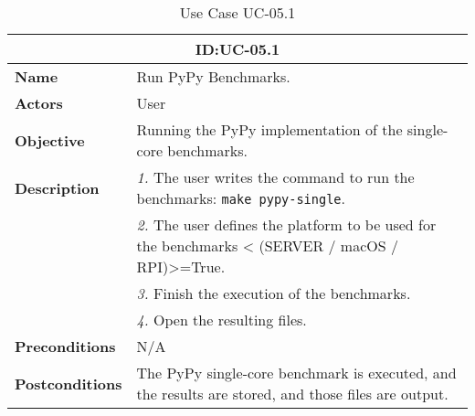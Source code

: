 \begin{table}[H]
    \centering
    \begin{tabular}{l p{10cm}}
        \toprule
        \multicolumn{2}{c}{\textbf{ID:\@ UC-05.1}} \\
        \toprule
        \textbf{Name}                         &  Run PyPy Benchmarks. \\
        \textbf{Actors}                       &  User \\
        \textbf{Objective}                    &  Running the PyPy implementation of the single-core benchmarks. \\
        \multirow{1}{*}{\textbf{Description}} & \textsl{1.} The user writes the command to run the benchmarks: \texttt{make pypy-single}.\\
                                              & \textsl{2.} The user defines the platform to be used for the benchmarks < (SERVER / macOS / RPI)>=True.\\
                                              & \textsl{3.} Finish the execution of the benchmarks.\\
                                              & \textsl{4.} Open the resulting files.\\
        \textbf{Preconditions}                &  N/A \\
        \textbf{Postconditions}               &  The PyPy single-core benchmark is executed, and the results are stored, and those files are output. \\
    \end{tabular}
    \caption{Use Case UC-05.1}\label{tab:uc-05.1}
\end{table}

